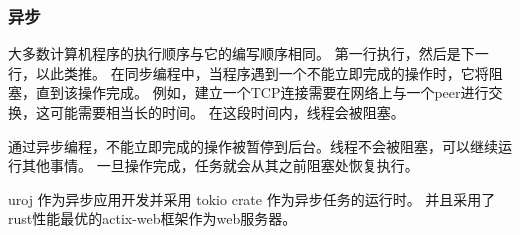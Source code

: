 \subsubsection{异步}
大多数计算机程序的执行顺序与它的编写顺序相同。
第一行执行，然后是下一行，以此类推。
在同步编程中，当程序遇到一个不能立即完成的操作时，它将阻塞，直到该操作完成。
例如，建立一个TCP连接需要在网络上与一个peer进行交换，这可能需要相当长的时间。
在这段时间内，线程会被阻塞。

通过异步编程，不能立即完成的操作被暂停到后台。线程不会被阻塞，可以继续运行其他事情。
一旦操作完成，任务就会从其之前阻塞处恢复执行。

uroj 作为异步应用开发并采用 tokio crate 作为异步任务的运行时。
并且采用了rust性能最优的actix-web框架作为web服务器。